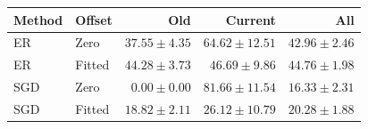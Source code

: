 \begin{tabular}{llrrr}
\toprule
Method & Offset & Old & Current & All \\
\midrule
ER & Zero & $37.55\pm4.35$ & $64.62\pm12.51$ & $42.96\pm2.46$ \\
ER & Fitted & $44.28\pm3.73$ & $46.69\pm9.86$ & $44.76\pm1.98$ \\
\midrule
SGD & Zero & $0.00\pm0.00$ & $81.66\pm11.54$ & $16.33\pm2.31$ \\
SGD & Fitted & $18.82\pm2.11$ & $26.12\pm10.79$ & $20.28\pm1.88$ \\
\bottomrule
\end{tabular}
